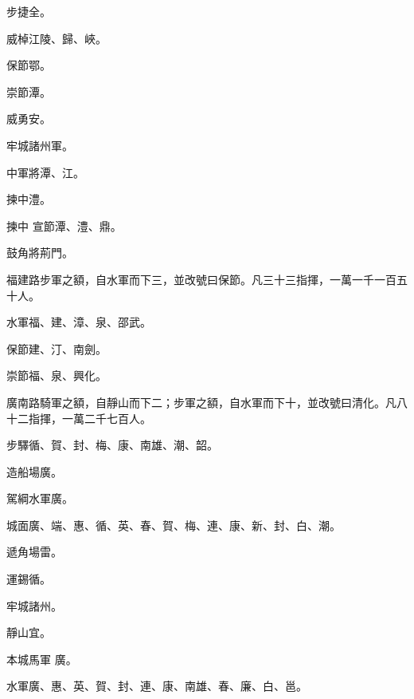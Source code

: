 \begin{pinyinscope}
 步捷全。



 威棹江陵、歸、峽。



 保節鄂。



 崇節潭。



 威勇安。



 牢城諸州軍。



 中軍將潭、江。



 揀中澧。



 揀中
 宣節潭、澧、鼎。



 鼓角將荊門。



 福建路步軍之額，自水軍而下三，並改號曰保節。凡三十三指揮，一萬一千一百五十人。



 水軍福、建、漳、泉、邵武。



 保節建、汀、南劍。



 崇節福、泉、興化。



 廣南路騎軍之額，自靜山而下二；步軍之額，自水軍而下十，並改號曰清化。凡八十二指揮，一萬二千七百人。



 步驛循、賀、封、梅、康、南雄、潮、韶。



 造船場廣。



 駕綱水軍廣。



 城面廣、端、惠、循、英、春、賀、梅、連、康、新、封、白、潮。



 遞角場雷。



 運錫循。



 牢城諸州。



 靜山宜。



 本城馬軍
 廣。



 水軍廣、惠、英、賀、封、連、康、南雄、春、廉、白、邕。




\end{pinyinscope}
